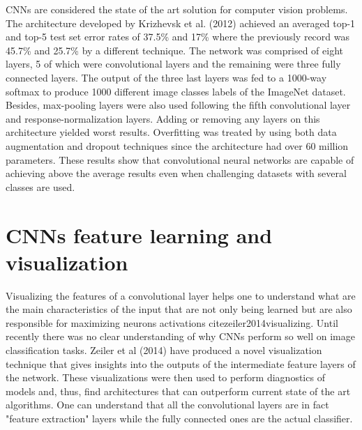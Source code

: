 CNNs are considered the state of the art solution for computer vision problems. The architecture developed by Krizhevsk et al. (2012) achieved an averaged top-1 and top-5 test set error rates of 37.5\% and 17\% where the previously record was 45.7\% and 25.7\% by a different technique. The network was comprised of eight layers, 5 of which were convolutional layers and the remaining were three fully connected layers. The output of the three last layers was fed to a 1000-way softmax to produce 1000 different image classes labels of the ImageNet dataset. Besides, max-pooling layers were also used following the fifth convolutional layer and response-normalization layers. Adding or removing any layers on this architecture yielded worst results. Overfitting was treated by using both data augmentation and dropout \cite{hinton2012improving} techniques since the architecture had over 60 million parameters. These results show that convolutional neural networks are capable of achieving above the average results even when challenging datasets with several classes are used.
\section{CNNs feature learning and visualization}

Visualizing the features of a convolutional layer helps one to understand what are the main characteristics of the input that are not only being learned but are also responsible for maximizing neurons activations cite{zeiler2014visualizing}. Until recently there was no clear understanding of why CNNs perform so well on image classification tasks. Zeiler et al (2014) \cite{zeiler2014visualizing} have produced a novel visualization technique that gives insights into the outputs of the intermediate feature layers of the network. These visualizations were then used to perform diagnostics of models and, thus, find architectures that can outperform current state of the art algorithms. One can understand that all the convolutional layers are in fact "feature extraction" layers while the fully connected ones are the actual classifier.

